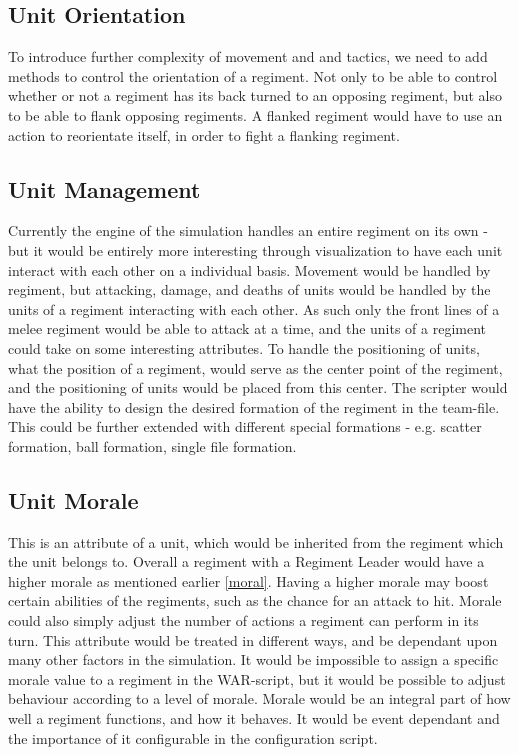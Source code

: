 \subsection{Unit Orientation}
To introduce further complexity of movement and and tactics, we need to add methods to control the orientation of a regiment. Not only to be able to control whether or not a regiment has its back turned to an opposing regiment, but also to be able to flank opposing regiments. A flanked regiment would have to use an action to reorientate itself, in order to fight a flanking regiment.
\subsection{Unit Management}
Currently the engine of the simulation handles an entire regiment on its own - but it would be entirely more interesting through visualization to have each unit interact with each other on a individual basis. Movement would be handled by regiment, but attacking, damage, and deaths of units would be handled by the units of a regiment interacting with each other. As such only the front lines of a melee regiment would be able to attack at a time, and the units of a regiment could take on some interesting attributes. 
To handle the positioning of units, what the position of a regiment, would serve as the center point of the regiment, and the positioning of units would be placed from this center. The scripter would have the ability to design the desired formation of the regiment in the team-file. This could be further extended with different special formations - e.g. scatter formation, ball formation, single file formation.
\subsection{Unit Morale}
This is an attribute of a unit, which would be inherited from the regiment which the unit belongs to. Overall a regiment with a Regiment Leader would have a higher morale as mentioned earlier \ref{moral}. Having a higher morale may boost certain abilities of the regiments, such as the chance for an attack to hit. Morale could also simply adjust the number of actions a regiment can perform in its turn. This attribute would be treated in different ways, and be dependant upon many other factors in the simulation. It would be impossible to assign a specific morale value to a regiment in the WAR-script, but it would be possible to adjust behaviour according to a level of morale. Morale would be an integral part of how well a regiment functions, and how it behaves. It would be event dependant and the importance of it configurable in the configuration script. 
